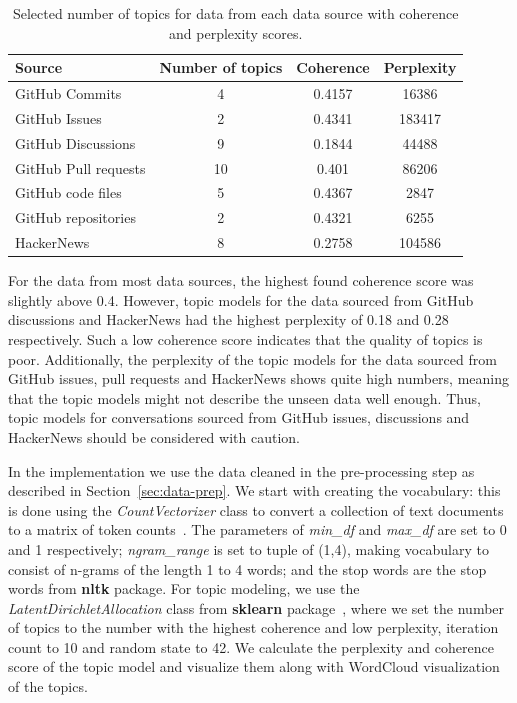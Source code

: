 \begin{table}[H]
\centering
\begin{tabular}{|l||c|c|c|}
\hline
Source           & Number of topics & Coherence & Perplexity \\ 
\hline
GitHub Commits       & 4    & 0.4157  & 16386     \\
\hline
GitHub Issues        & 2    & 0.4341  & 183417    \\
\hline
GitHub Discussions   & 9    & 0.1844  & 44488     \\
\hline
GitHub Pull requests & 10   & 0.401   & 86206     \\
\hline
GitHub code files    & 5    & 0.4367  & 2847      \\
\hline
GitHub repositories  & 2    & 0.4321  & 6255      \\
\hline
HackerNews       & 8    & 0.2758  & 104586     \\
\hline 
\end{tabular}   
\caption{Selected number of topics for data from each data source with coherence and perplexity scores.}
\label{table:topics_nr} 
\end{table}

For the data from most data sources, the highest found coherence score was slightly above 0.4. However, topic models for the data sourced from GitHub discussions and HackerNews had the highest perplexity of 0.18 and 0.28 respectively. Such a low coherence score indicates that the quality of topics is poor. Additionally, the perplexity of the topic models for the data sourced from GitHub issues, pull requests and HackerNews shows quite high numbers, meaning that the topic models might not describe the unseen data well enough. Thus, topic models for conversations sourced from GitHub issues, discussions and HackerNews should be considered with caution.

In the implementation we use the data cleaned in the pre-processing step as described in Section~\ref{sec:data-prep}. We start with creating the vocabulary: this is done using the \textit{CountVectorizer} class to convert a collection of text documents to a matrix of token counts~\cite{scikitlearnCountVectorizer}. The parameters of \textit{min\_df} and \textit{max\_df} are set to 0 and 1 respectively; \textit{ngram\_range} is set to tuple of (1,4), making vocabulary to consist of n-grams of the length 1 to 4 words; and the stop words are the stop words from \textbf{nltk} package. For topic modeling, we use the \textit{LatentDirichletAllocation} class from \textbf{sklearn} package~\cite{scikitlearnLatentDirichletAllocation}, where we set the number of topics to the number with the highest coherence and low perplexity, iteration count to 10 and random state to 42. We calculate the perplexity and coherence score of the topic model and visualize them along with WordCloud visualization of the topics. 